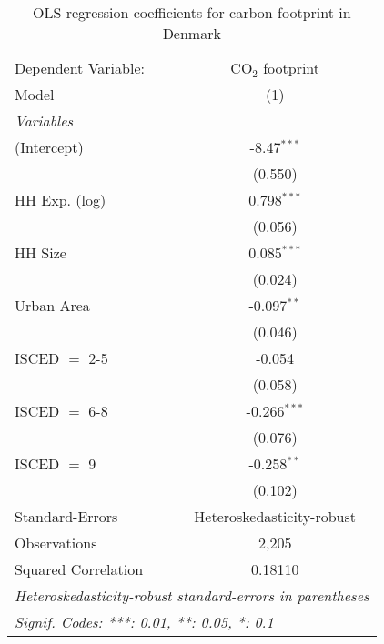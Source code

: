 
\begin{table}[htbp!]
   \centering
   \small
   \begin{adjustbox}{width = 1\textwidth, max height = 0.95\textheight, center}
      \begin{threeparttable}[b]
         \caption{\label{tab:OLS_2_DNK} OLS-regression coefficients for carbon footprint in Denmark}
         \begin{tabular}{lc}
            \tabularnewline \midrule \midrule
            Dependent Variable: & CO$_{2}$ footprint\\  
            Model               & (1)\\  
            \midrule
            \emph{Variables}\\
            (Intercept)         & -8.47$^{***}$\\   
                                & (0.550)\\   
            HH Exp. (log)       & 0.798$^{***}$\\   
                                & (0.056)\\   
            HH Size             & 0.085$^{***}$\\   
                                & (0.024)\\   
            Urban Area          & -0.097$^{**}$\\   
                                & (0.046)\\   
            ISCED $=$ 2-5       & -0.054\\   
                                & (0.058)\\   
            ISCED $=$ 6-8       & -0.266$^{***}$\\   
                                & (0.076)\\   
            ISCED $=$ 9         & -0.258$^{**}$\\   
                                & (0.102)\\   
            \midrule 
            Standard-Errors     & Heteroskedasticity-robust \\   
            Observations        & 2,205\\  
            Squared Correlation & 0.18110\\  
            \midrule \midrule
            \multicolumn{2}{l}{\emph{Heteroskedasticity-robust standard-errors in parentheses}}\\
            \multicolumn{2}{l}{\emph{Signif. Codes: ***: 0.01, **: 0.05, *: 0.1}}\\
         \end{tabular}
         

\end{threeparttable}
\end{adjustbox}
\end{table}
